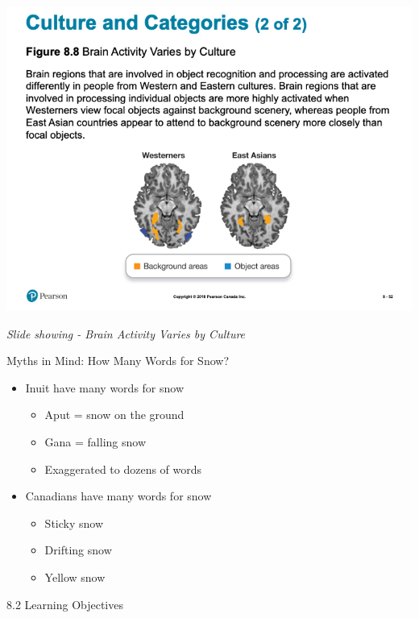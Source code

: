 \documentclass[
]{book}
\providecommand{\tightlist}{%
  \setlength{\itemsep}{0pt}\setlength{\parskip}{0pt}}
\begin{document}
\begin{reflect}
\includegraphics{assets/unit_1/slide_52.png}

\emph{Slide showing - Brain Activity Varies by Culture}

Myths in Mind: How Many Words for Snow?

\begin{itemize}
\tightlist
\item
  Inuit have many words for snow

  \begin{itemize}
  \tightlist
  \item
    Aput = snow on the ground\\
  \item
    Gana = falling snow\\
  \item
    Exaggerated to dozens of words\\
  \end{itemize}
\item
  Canadians have many words for snow

  \begin{itemize}
  \tightlist
  \item
    Sticky snow\\
  \item
    Drifting snow\\
  \item
    Yellow snow
  \end{itemize}
\end{itemize}

8.2 Learning Objectives


\end{reflect}
\end{document}
